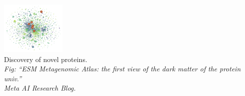 \documentclass[aspectratio=169]{beamer}
\begin{document}
\begin{frame}
\begin{center}
\includegraphics[height=7em]{../img/probs/meta-protein.png}\\
{\small
Discovery of novel proteins.\\
}
{\tiny \sl
Fig: ``ESM Metagenomic Atlas: the first view of the dark matter of the protein
univ.''\\
Meta AI Research Blog.\\
}
\end{center}

\end{frame}
\end{document}
